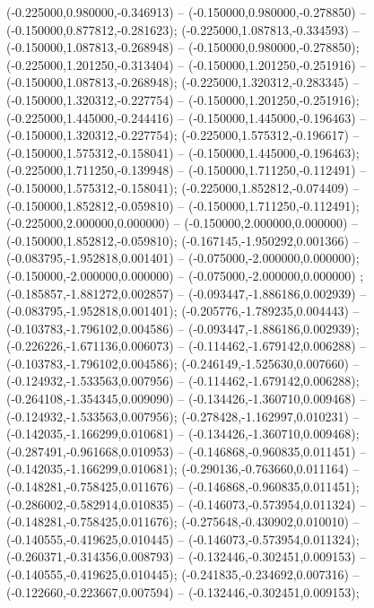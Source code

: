  (-0.225000,0.980000,-0.346913) -- (-0.150000,0.980000,-0.278850) -- (-0.150000,0.877812,-0.281623);
 (-0.225000,1.087813,-0.334593) -- (-0.150000,1.087813,-0.268948) -- (-0.150000,0.980000,-0.278850);
 (-0.225000,1.201250,-0.313404) -- (-0.150000,1.201250,-0.251916) -- (-0.150000,1.087813,-0.268948);
 (-0.225000,1.320312,-0.283345) -- (-0.150000,1.320312,-0.227754) -- (-0.150000,1.201250,-0.251916);
 (-0.225000,1.445000,-0.244416) -- (-0.150000,1.445000,-0.196463) -- (-0.150000,1.320312,-0.227754);
 (-0.225000,1.575312,-0.196617) -- (-0.150000,1.575312,-0.158041) -- (-0.150000,1.445000,-0.196463);
 (-0.225000,1.711250,-0.139948) -- (-0.150000,1.711250,-0.112491) -- (-0.150000,1.575312,-0.158041);
 (-0.225000,1.852812,-0.074409) -- (-0.150000,1.852812,-0.059810) -- (-0.150000,1.711250,-0.112491);
 (-0.225000,2.000000,0.000000) -- (-0.150000,2.000000,0.000000) -- (-0.150000,1.852812,-0.059810);
 (-0.167145,-1.950292,0.001366) -- (-0.083795,-1.952818,0.001401) -- (-0.075000,-2.000000,0.000000);
 (-0.150000,-2.000000,0.000000) -- (-0.075000,-2.000000,0.000000) ;
 (-0.185857,-1.881272,0.002857) -- (-0.093447,-1.886186,0.002939) -- (-0.083795,-1.952818,0.001401);
 (-0.205776,-1.789235,0.004443) -- (-0.103783,-1.796102,0.004586) -- (-0.093447,-1.886186,0.002939);
 (-0.226226,-1.671136,0.006073) -- (-0.114462,-1.679142,0.006288) -- (-0.103783,-1.796102,0.004586);
 (-0.246149,-1.525630,0.007660) -- (-0.124932,-1.533563,0.007956) -- (-0.114462,-1.679142,0.006288);
 (-0.264108,-1.354345,0.009090) -- (-0.134426,-1.360710,0.009468) -- (-0.124932,-1.533563,0.007956);
 (-0.278428,-1.162997,0.010231) -- (-0.142035,-1.166299,0.010681) -- (-0.134426,-1.360710,0.009468);
 (-0.287491,-0.961668,0.010953) -- (-0.146868,-0.960835,0.011451) -- (-0.142035,-1.166299,0.010681);
 (-0.290136,-0.763660,0.011164) -- (-0.148281,-0.758425,0.011676) -- (-0.146868,-0.960835,0.011451);
 (-0.286002,-0.582914,0.010835) -- (-0.146073,-0.573954,0.011324) -- (-0.148281,-0.758425,0.011676);
 (-0.275648,-0.430902,0.010010) -- (-0.140555,-0.419625,0.010445) -- (-0.146073,-0.573954,0.011324);
 (-0.260371,-0.314356,0.008793) -- (-0.132446,-0.302451,0.009153) -- (-0.140555,-0.419625,0.010445);
 (-0.241835,-0.234692,0.007316) -- (-0.122660,-0.223667,0.007594) -- (-0.132446,-0.302451,0.009153);
